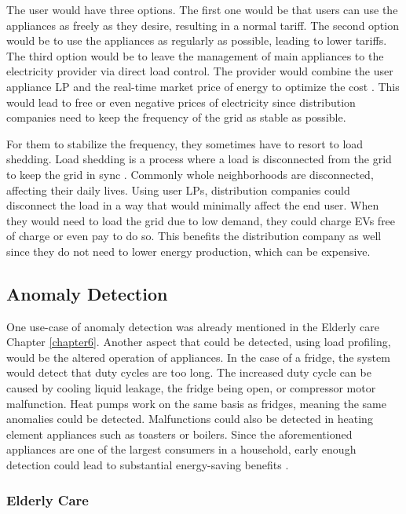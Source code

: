 The user would have three options. The first one would be that users can use the appliances as freely as they desire, resulting in a normal tariff.
The second option would be to use the appliances as regularly as possible, leading to lower tariffs.
The third option would be to leave the management of main appliances to the electricity provider via direct load control.
The provider would combine the user appliance LP and the real-time market price of energy to optimize the cost \cite{optimiseCostShift2015}.
This would lead to free or even negative prices of electricity since distribution companies need to keep the frequency of the grid as stable as possible.

For them to stabilize the frequency, they sometimes have to resort to load shedding.
Load shedding is a process where a load is disconnected from the grid to keep the grid in sync \cite{loadShedding2006}.
Commonly whole neighborhoods are disconnected, affecting their daily lives.
Using user LPs, distribution companies could disconnect the load in a way that would minimally affect the end user. 
When they would need to load the grid due to low demand, they could charge EVs free of charge or even pay to do so. 
This benefits the distribution company as well since they do not need to lower energy production, which can be expensive. 

\subsection{Anomaly Detection}

One use-case of anomaly detection was already mentioned in the Elderly care Chapter \ref{chapter6}.
Another aspect that could be detected, using load profiling, would be the altered operation of appliances.
In the case of a fridge, the system would detect that duty cycles are too long.
The increased duty cycle can be caused by cooling liquid leakage, the fridge being open, or compressor motor malfunction.
Heat pumps work on the same basis as fridges, meaning the same anomalies could be detected. 
Malfunctions could also be detected in heating element appliances such as toasters or boilers. 
Since the aforementioned appliances are one of the largest consumers in a household,
early enough detection could lead to substantial energy-saving benefits \cite{NILMAD2019}.

\subsubsection{Elderly Care}

